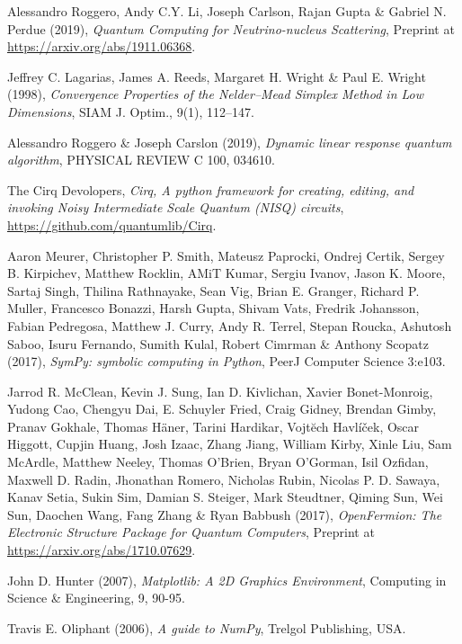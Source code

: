\documentclass[10 pt, a4paper]{article}
\begin{document}
\begin{thebibliography}{99}
 Alessandro Roggero, Andy C.Y. Li, Joseph Carlson, Rajan Gupta \& Gabriel N. Perdue (2019), \textit{Quantum Computing for Neutrino-nucleus Scattering}, Preprint at \url{https://arxiv.org/abs/1911.06368}.

 Jeffrey C. Lagarias, James A. Reeds, Margaret H. Wright \& Paul E. Wright (1998), \textit{Convergence Properties of the Nelder--Mead Simplex Method in Low Dimensions}, SIAM J. Optim., 9(1), 112–147.

 Alessandro Roggero \& Joseph Carslon (2019), \textit{Dynamic linear response quantum algorithm}, PHYSICAL REVIEW C 100, 034610.

 The Cirq Devolopers, \textit{Cirq, A python framework for creating, editing, and invoking Noisy Intermediate Scale Quantum (NISQ) circuits}, \url{https://github.com/quantumlib/Cirq}.

 Aaron Meurer​, Christopher P. Smith, Mateusz Paprocki, Ondrej Certik, Sergey B. Kirpichev, Matthew Rocklin, AMiT Kumar, Sergiu Ivanov, Jason K. Moore, Sartaj Singh, Thilina Rathnayake, Sean Vig, Brian E. Granger, Richard P. Muller, Francesco Bonazzi, Harsh Gupta, Shivam Vats, Fredrik Johansson, Fabian Pedregosa, Matthew J. Curry, Andy R. Terrel, Stepan Roucka, Ashutosh Saboo, Isuru Fernando, Sumith Kulal, Robert Cimrman \& Anthony Scopatz (2017), \textit{SymPy: symbolic computing in Python},  PeerJ Computer Science 3:e103.

 Jarrod R. McClean, Kevin J. Sung, Ian D. Kivlichan, Xavier Bonet-Monroig, Yudong Cao, Chengyu Dai, E. Schuyler Fried, Craig Gidney, Brendan Gimby, Pranav Gokhale, Thomas Häner, Tarini Hardikar, Vojtĕch Havlíček, Oscar Higgott, Cupjin Huang, Josh Izaac, Zhang Jiang, William Kirby, Xinle Liu, Sam McArdle, Matthew Neeley, Thomas O'Brien, Bryan O'Gorman, Isil Ozfidan, Maxwell D. Radin, Jhonathan Romero, Nicholas Rubin, Nicolas P. D. Sawaya, Kanav Setia, Sukin Sim, Damian S. Steiger, Mark Steudtner, Qiming Sun, Wei Sun, Daochen Wang, Fang Zhang \& Ryan Babbush (2017), \textit{OpenFermion: The Electronic Structure Package for Quantum Computers}, Preprint at \url{https://arxiv.org/abs/1710.07629}.


 John D. Hunter (2007), \textit{Matplotlib: A 2D Graphics Environment}, Computing in Science \& Engineering, 9, 90-95.

 Travis E. Oliphant (2006), \textit{A guide to NumPy}, Trelgol Publishing, USA.






\end{thebibliography}






\end{document}
